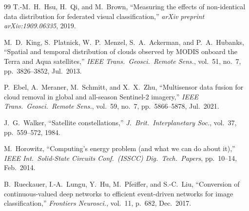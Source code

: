 \documentclass[conference]{IEEEtran}
\begin{document}
\begin{thebibliography}{99}
T.-M.~H.~Hsu, H.~Qi, and M.~Brown,
``Measuring the effects of non-identical data distribution for
federated visual classification,''
\emph{arXiv preprint arXiv:1909.06335}, 2019.

M.~D.~King, S.~Platnick, W.~P.~Menzel, S.~A.~Ackerman, and
P.~A.~Hubanks,
``Spatial and temporal distribution of clouds observed by MODIS
onboard the Terra and Aqua satellites,''
\emph{IEEE Trans.\ Geosci.\ Remote Sens.}, vol.~51, no.~7,
pp.~3826--3852, Jul.\ 2013.

P.~Ebel, A.~Meraner, M.~Schmitt, and X.~X.~Zhu,
``Multisensor data fusion for cloud removal in global and all-season
Sentinel-2 imagery,''
\emph{IEEE Trans.\ Geosci.\ Remote Sens.}, vol.~59, no.~7,
pp.~5866--5878, Jul.\ 2021.

J.~G.~Walker,
``Satellite constellations,''
\emph{J.\ Brit.\ Interplanetary Soc.}, vol.~37, pp.~559--572, 1984.

M.~Horowitz,
``Computing's energy problem (and what we can do about it),''
\emph{IEEE Int.\ Solid-State Circuits Conf.\ (ISSCC) Dig.\ Tech.\
Papers}, pp.~10--14, Feb.\ 2014.

B.~Rueckauer, I.-A.~Lungu, Y.~Hu, M.~Pfeiffer, and S.-C.~Liu,
``Conversion of continuous-valued deep networks to efficient
event-driven networks for image classification,''
\emph{Frontiers Neurosci.}, vol.~11, p.~682, Dec.\ 2017.


\end{thebibliography}
\end{document}

